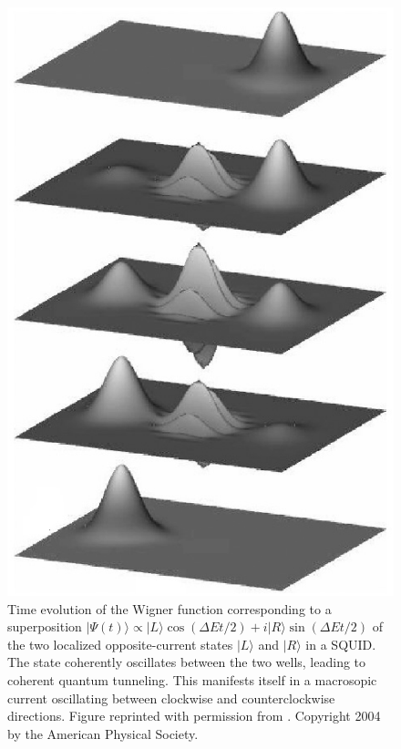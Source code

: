 \documentclass[twocolumn,aps,floatfix,amsmath,amssymb,showpacs,nofootinbib]{revtex4}
\newcommand{\ket}[1]{\ensuremath{|{#1\rangle}}}
\begin{document}
\begin{figure}
\begin{center}
\includegraphics[scale=.25]{dec.eps}
\end{center}
\caption[Time evolution of the Wigner function
corresponding to a superposition $\ket{\Psi(t)} \propto \ket{L} \cos
(\Delta E t / 2) + i \ket{R} \sin(\Delta E t / 2)$ of the two
localized opposite-current states $\ket{L}$ and $\ket{R}$ in a
SQUID]{\label{fig:wigner1} Time evolution of the Wigner function
  corresponding to a superposition $\ket{\Psi(t)} \propto \ket{L} \cos
  (\Delta E t / 2) + i \ket{R} \sin(\Delta E t / 2)$ of the two
  localized opposite-current states $\ket{L}$ and $\ket{R}$ in a
  SQUID.  The state coherently oscillates between the two wells,
  leading to coherent quantum tunneling. This manifests itself in a
  macrosopic current oscillating between clockwise and
  counterclockwise directions.  Figure reprinted with permission from
  \cite{Everitt:2004:mb}. Copyright 2004 by the American Physical
  Society.  }
\end{figure}
\end{document}
